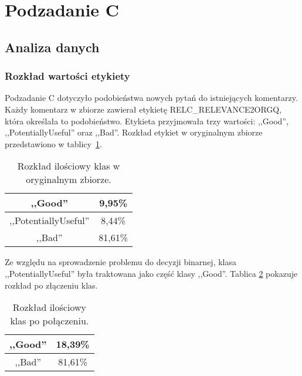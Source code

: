 \section{Podzadanie C}
\subsection{Analiza danych}
\subsubsection{Rozkład wartości etykiety}

Podzadanie C dotyczyło podobieństwa nowych pytań do istniejących komentarzy.  Każdy komentarz w zbiorze zawierał etykietę RELC\_RELEVANCE2ORGQ, która określała to podobieństwo. Etykieta przyjmowała trzy wartości: ,,Good'', ,,PotentiallyUseful'' oraz ,,Bad''. Rozkład etykiet w oryginalnym zbiorze przedstawiono w tablicy~\ref{c_original_set_percentage}.

\begin{table}[H]
\caption{Rozkład ilościowy klas w oryginalnym zbiorze.}
\label{c_original_set_percentage}
    \begin{center}
        \begin{tabular}{ |c|c| } 
            \hline
            ,,Good'' & 9,95\% \\
            \hline
            ,,PotentiallyUseful'' & 8,44\% \\
            \hline
            ,,Bad'' & 81,61\% \\ 
            \hline
        \end{tabular}
    \end{center}
\end{table}

Ze względu na sprowadzenie problemu do decyzji binarnej, klasa ,,PotentiallyUseful'' była traktowana jako część klasy ,,Good''. Tablica \ref{c_merged_set_percentage} pokazuje rozkład po złączeniu klas.

\begin{table}[H]
\caption{Rozkład ilościowy klas po połączeniu.}
\label{c_merged_set_percentage}
    \begin{center}
        \begin{tabular}{ |c|c| } 
            \hline
            ,,Good'' & 18,39\% \\
            \hline
            ,,Bad'' & 81,61\% \\ 
            \hline
        \end{tabular}
    \end{center}
\end{table}

